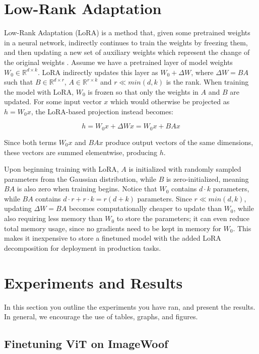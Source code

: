 \documentclass[10pt]{article}
\begin{document}
\section{Low-Rank Adaptation}
\label{sec:lora}

Low-Rank Adaptation (LoRA) is a method that, given some pretrained weights in a neural network, indirectly continues to train the weights by freezing them, and then updating a new set of auxiliary weights which represent the change of the original weights \cite{hu2021loralowrankadaptationlarge}. Assume we have a pretrained layer of model weights $W_0 \in \mathbb{R}^{d \times k}$. LoRA indirectly updates this layer as $W_0 + \Delta W$, where $\Delta W = BA$ such that $B \in \mathbb{R}^{d \times r}$, $A \in \mathbb{R}^{r \times k}$ and $r \ll min(d, k)$ is the rank. When training the model with LoRA, $W_0$ is frozen so that only the weights in $A$ and $B$ are updated. For some input vector $x$ which would otherwise be projected as $h = W_0x$, the LoRA-based projection instead becomes:

\begin{equation}
    h = W_0x + \Delta Wx = W_0x + BAx
\end{equation}

Since both terms $W_0x$ and $BAx$ produce output vectors of the same dimensions, these vectors are summed elementwise, producing $h$.

Upon beginning training with LoRA, $A$ is initialized with randomly sampled parameters from the Gaussian distribution, while $B$ is zero-initialized, meaning $BA$ is also zero when training begins. Notice that $W_0$ contains $d \cdot k$ parameters, while $BA$ contains $d \cdot r + r \cdot k = r(d + k)$ parameters. Since $r \ll min(d, k)$, updating $\Delta W = BA$ becomes computationally cheaper to update than $W_0$, while also requiring less memory than $W_0$ to store the parameters; it can even reduce total memory usage, since no gradients need to be kept in memory for $W_0$. This makes it inexpensive to store a finetuned model with the added LoRA decomposition for deployment in production tasks.

\section{Experiments and Results}
In this section you outline the experiments you have ran, and present the results.
In general, we encourage the use of tables, graphs, and figures.

\subsection{Finetuning ViT on ImageWoof}
\label{subsec:finetuning_vit_imagewoof}
\end{document}
